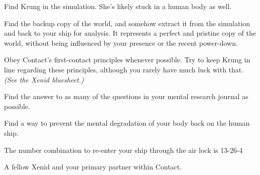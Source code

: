 \documentclass[char]{guildcamp1}
\begin{document}

\begin{itemz}[Goals]
  \item Find Krung in the simulation. She's likely stuck in a human body as well.
  \item Find the backup copy of the world, and somehow extract it from the simulation and back to your ship for analysis. It represents a perfect and pristine copy of the world, without being influenced by your presence or the recent power-down.
  \item Obey Contact's first-contact principles whenever possible. Try to keep Krung in line regarding these principles, although you rarely have much luck with that. \emph{(See the Xenid bluesheet.)}
  \item Find the answer to as many of the questions in your mental research journal as possible.
  \item Find a way to prevent the mental degradation of your body back on the human ship.
  
\end{itemz}

\begin{itemz}[Notes]
  \item The number combination to re-enter your ship through the air lock is 13-26-4
\end{itemz}

\begin{contacts}
   A fellow Xenid and your primary partner within Contact.
\end{contacts}



\endtag
\end{document}
